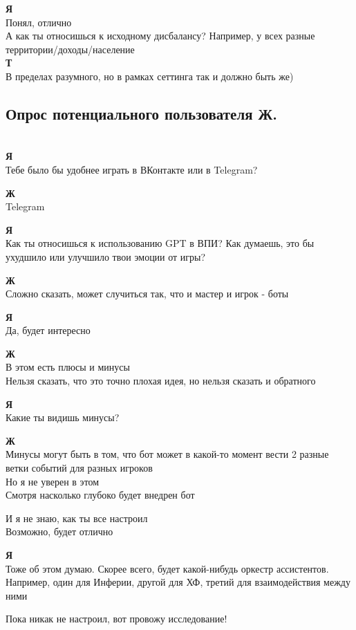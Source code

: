 \textbf{Я}\\
Понял, отлично\\
А как ты относишься к исходному дисбалансу? Например, у всех разные территории/доходы/население\\

\textbf{Т}\\
В пределах разумного, но в рамках сеттинга так и должно быть же)\\

\subsection{Опрос потенциального пользователя Ж.}\\
\textbf{Я}\\
Тебе было бы удобнее играть в ВКонтакте или в Telegram?

\textbf{Ж}\\
Telegram

\textbf{Я}\\
Как ты относишься к использованию GPT в ВПИ? Как думаешь, это бы ухудшило или улучшило твои эмоции от игры?

\textbf{Ж}\\
Сложно сказать, может случиться так, что и мастер и игрок - боты

\textbf{Я}\\
Да, будет интересно

\textbf{Ж}\\
В этом есть плюсы и минусы\\
Нельзя сказать, что это точно плохая идея, но нельзя сказать и обратного

\textbf{Я}\\
Какие ты видишь минусы?

\textbf{Ж}\\
Минусы могут быть в том, что бот может в какой-то момент вести 2 разные ветки событий для разных игроков\\
Но я не уверен в этом\\
Смотря насколько глубоко будет внедрен бот

И я не знаю, как ты все настроил\\
Возможно, будет отлично

\textbf{Я}\\
Тоже об этом думаю. Скорее всего, будет какой-нибудь оркестр ассистентов. Например, один для Инферии, другой для ХФ, третий для взаимодействия между ними

Пока никак не настроил, вот провожу исследование!

